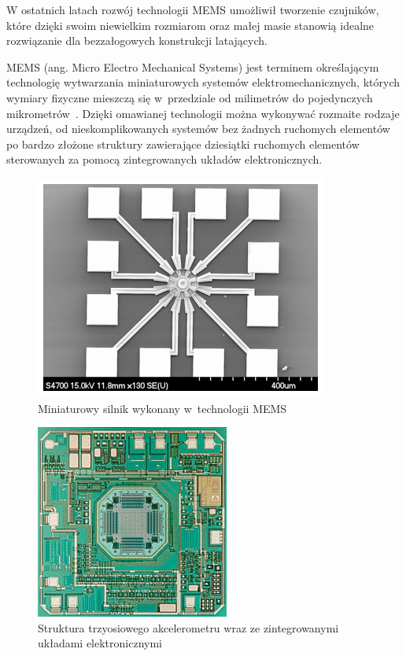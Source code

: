 \documentclass[11pt, twoside]{Thesis} %
\begin{document}
W ostatnich latach rozwój technologii MEMS umożliwił tworzenie czujników, które dzięki swoim niewielkim rozmiarom oraz małej masie stanowią idealne rozwiązanie dla bezzałogowych konstrukcji latających. 

MEMS (ang. Micro Electro Mechanical Systems) jest terminem określającym technologię wytwarzania miniaturowych systemów elektromechanicznych, których wymiary fizyczne mieszczą się w~przedziale od milimetrów do pojedynczych mikrometrów~\cite{mems3, mems12, mems14}. Dzięki omawianej technologii można wykonywać rozmaite rodzaje urządzeń, od nieskomplikowanych systemów bez żadnych ruchomych elementów po bardzo złożone struktury zawierające dziesiątki ruchomych elementów sterowanych za pomocą zintegrowanych układów elektronicznych. 

\begin{figure}[H]
	\centering
	\includegraphics[scale=0.7]{Pictures/microactuator.png}
		\caption[Miniaturowy silnik wykonany w~technologii MEMS]{Miniaturowy silnik wykonany w~technologii MEMS~\cite{mems15}}
	\label{fig:microactuator}
\end{figure}

\begin{figure}[H]
	\centering
	\includegraphics[scale=0.7]{Pictures/3d_accel.jpg}
		\caption[Struktura trzyosiowego akcelerometru wraz ze zintegrowanymi układami elektronicznymi]{Struktura trzyosiowego akcelerometru wraz ze zintegrowanymi układami elektronicznymi~\cite{mems16}}
	\label{fig:3d_accelerometer}
\end{figure}
\end{document}
